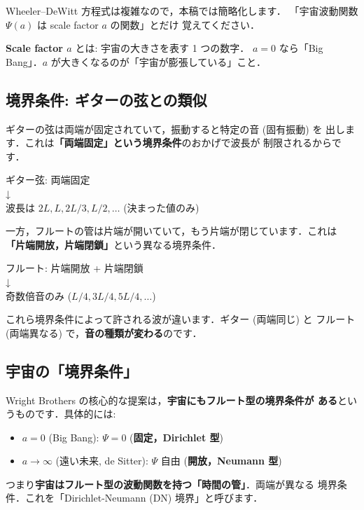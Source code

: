 \documentclass[11pt,a4paper]{article}
\begin{document}
Wheeler--DeWitt 方程式は複雑なので，本稿では簡略化します．
「宇宙波動関数 $\Psi(a)$ は scale factor $a$ の関数」とだけ
覚えてください．

\textbf{Scale factor $a$} とは: 宇宙の大きさを表す 1 つの数字．
$a = 0$ なら「Big Bang」．$a$ が大きくなるのが「宇宙が膨張している」こと．

\subsection{境界条件: ギターの弦との類似}

ギターの弦は両端が固定されていて，振動すると特定の音 (固有振動) を
出します．これは\textbf{「両端固定」という境界条件}のおかげで波長が
制限されるからです．

\begin{center}
ギター弦: 両端固定\\
↓\\
波長は $2L, L, 2L/3, L/2, \ldots$ (決まった値のみ)
\end{center}

一方，フルートの管は片端が開いていて，もう片端が閉じています．これは
\textbf{「片端開放，片端閉鎖」}という異なる境界条件．

\begin{center}
フルート: 片端開放 + 片端閉鎖\\
↓\\
奇数倍音のみ ($L/4, 3L/4, 5L/4, \ldots$)
\end{center}

これら境界条件によって許される波が違います．ギター (両端同じ) と
フルート (両端異なる) で，\textbf{音の種類が変わる}のです．

\subsection{宇宙の「境界条件」}

Wright Brothers の核心的な提案は，\textbf{宇宙にもフルート型の境界条件が
ある}というものです．具体的には:
\begin{itemize}
\item $a = 0$ (Big Bang): $\Psi = 0$ (\textbf{固定，Dirichlet 型})
\item $a \to \infty$ (遠い未来, de Sitter): $\Psi$ 自由 (\textbf{開放，Neumann 型})
\end{itemize}

つまり\textbf{宇宙はフルート型の波動関数を持つ「時間の管」}．両端が異なる
境界条件．これを「Dirichlet-Neumann (DN) 境界」と呼びます．
\end{document}
